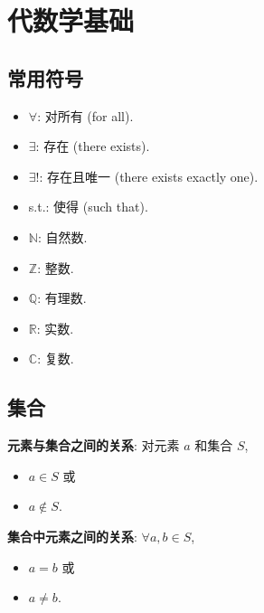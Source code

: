 \documentclass{note}
\begin{document}
\setcounter{chapter}{-1}
\fi
\chapter{代数学基础}
\section{常用符号}
\begin{itemize}
    \item $\forall$: 对所有 (for all).
    \item $\exists$: 存在 (there exists).
    \item $\exists!$: 存在且唯一 (there exists exactly one).
    \item s.t.: 使得 (such that).
    \item $\mathbb{N}$: 自然数.
    \item $\mathbb{Z}$: 整数.
    \item $\mathbb{Q}$: 有理数.
    \item $\mathbb{R}$: 实数.
    \item $\mathbb{C}$: 复数.
\end{itemize}

\section{集合}
\textbf{元素与集合之间的关系}: 对元素 $a$ 和集合 $S$,
\begin{itemize}
    \item $a\in S$ 或
    \item $a\notin S$.
\end{itemize}

\textbf{集合中元素之间的关系}: $\forall a,b\in S$,
\begin{itemize}
    \item $a=b$ 或
    \item $a\neq b$.
\end{itemize}
\end{document}

